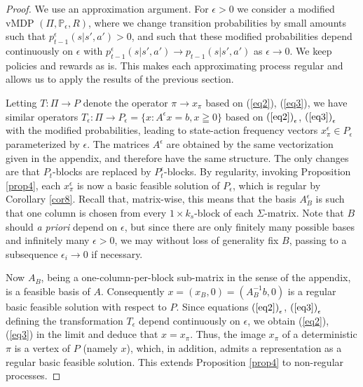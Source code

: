 \documentclass{article}
\theoremstyle{definition}
\numberwithin{equation}{section}
\begin{document}
\begin{proof}
    We use an approximation argument. For $\epsilon > 0$ we consider a modified vMDP
    $(\Pi, \mathbb P_\epsilon,R)$, where we change transition probabilities
by small amounts such that
$p_{t-1}^\epsilon(s|s',a') > 0$, and such that these modified probabilities
depend continuously on $\epsilon$ with
$p_{t-1}^\epsilon(s|s',a')\to p_{t-1}(s|s',a')$ as
$\epsilon \to 0$. We keep policies and rewards as is.
This makes each approximating process regular and allows us to apply the results of the previous section.

Letting $T:\Pi\to P$ denote the operator $\pi \to x_\pi$ based on (\ref{eq2}), (\ref{eq3}), we have 
similar operators $T_\epsilon:\Pi\to P_\epsilon = \{x: A^\epsilon x=b, x\geqq 0\}$
based on ${\rm (\ref{eq2})}_\epsilon$, ${\rm (\ref{eq3})}_\epsilon$ with the modified probabilities, leading to
state-action frequency vectors $x_\pi^\epsilon\in P_\epsilon$ 
parameterized by $\epsilon$. The matrices $A^\epsilon$ are obtained by the same vectorization given in the appendix, and therefore have the same 
structure. The only changes are that $P_t$-blocks are replaced  by
$P_t^\epsilon$-blocks.
By regularity, invoking Proposition \ref{prop4}, each $x_\pi^\epsilon$ is now a basic feasible solution of $P_\epsilon$, which is regular by Corollary \ref{cor8}. %
Recall that, matrix-wise, 
this means that the basis $A_B^{\epsilon}$ %
is such that one column is chosen
from every $1\times k_s$-block of each $\Sigma$-matrix. 
Note that $B$ should {\it a priori} depend on $\epsilon$, but since there are only finitely many possible bases and infinitely many $\epsilon>0$, we may without loss of generality
fix $B$, passing to a subsequence $\epsilon_i \to 0$ if necessary.

Now $A_B$, being a one-column-per-block sub-matrix in the sense of the appendix, is a feasible basis of $A$. Consequently $x = (x_B, 0) = (A_B^{-1}b, 0)$ is a regular basic feasible solution with respect to $P$. Since equations 
${\rm (\ref{eq2})}_\epsilon$, ${\rm (\ref{eq3})}_\epsilon$
defining the transformation $T_\epsilon$ depend continuously on $\epsilon$, we 
obtain (\ref{eq2}), (\ref{eq3}) in the limit and
deduce
that $x = x_\pi$. Thus, the
image $x_\pi$ of a deterministic $\pi$ is a vertex of $P$ (namely $x$), which, in addition, admits a representation as a regular basic feasible solution.
This extends Proposition \ref{prop4} to non-regular processes.  


\end{proof}
\end{document}
